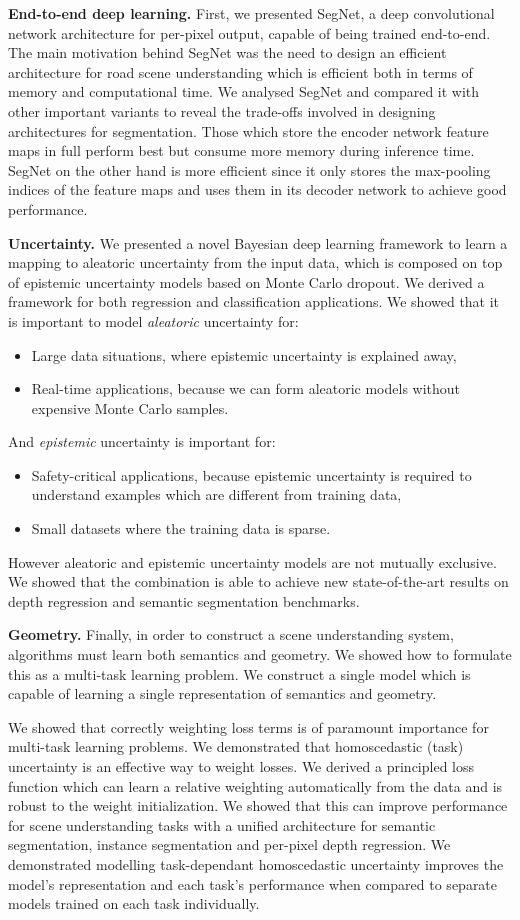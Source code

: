 \textbf{End-to-end deep learning.}
First, we presented SegNet, a deep convolutional network architecture for per-pixel output, capable of being trained end-to-end. The main motivation behind SegNet was the need to design an efficient architecture for road scene understanding which is efficient both in terms of memory and computational time. We analysed SegNet and compared it with other important variants to reveal the trade-offs involved in designing architectures for segmentation. Those which store the encoder network feature maps in full perform best but consume more memory during inference time. SegNet on the other hand is more efficient since it only stores the max-pooling indices of the feature maps and uses them in its decoder network to achieve good performance.

\textbf{Uncertainty.}
We presented a novel Bayesian deep learning framework to learn a mapping to aleatoric uncertainty from the input data, which is composed on top of epistemic uncertainty models based on Monte Carlo dropout. We derived a framework for both regression and classification applications. We showed that it is important to model \textit{aleatoric} uncertainty for:
\begin{itemize}
\item Large data situations, where epistemic uncertainty is explained away,
\item Real-time applications, because we can form aleatoric models without expensive Monte Carlo samples.
\end{itemize}
And \textit{epistemic} uncertainty is important for:
\begin{itemize}
\item Safety-critical applications, because epistemic uncertainty is required to understand examples which are different from training data,
\item Small datasets where the training data is sparse.
\end{itemize}

However aleatoric and epistemic uncertainty models are not mutually exclusive. We showed that the combination is able to achieve new state-of-the-art results on depth regression and semantic segmentation benchmarks.

\textbf{Geometry.}
Finally, in order to construct a scene understanding system, algorithms must learn both semantics and geometry. We showed how to formulate this as a multi-task learning problem. We construct a single model which is capable of learning a single representation of semantics and geometry. 

We showed that correctly weighting loss terms is of paramount importance for multi-task learning problems. We demonstrated that homoscedastic (task) uncertainty is an effective way to weight losses. We derived a principled loss function which can learn a relative weighting automatically from the data and is robust to the weight initialization. We showed that this can improve performance for scene understanding tasks with a unified architecture for semantic segmentation, instance segmentation and per-pixel depth regression. We demonstrated modelling task-dependant homoscedastic uncertainty improves the model's representation and each task's performance when compared to separate models trained on each task individually.
